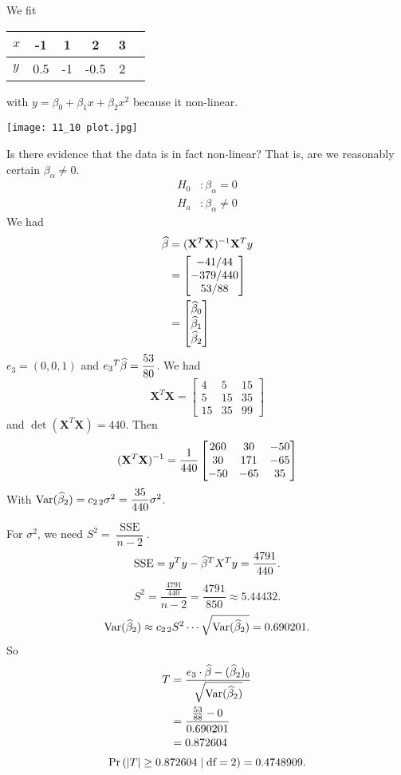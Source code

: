 \example*
We fit
\begin{center}
    \begin{tabular}{|l|c|c|c|c|c|}
         \hline
         $x$ & -1 & 1 & 2 & 3\\
         \hline
         $y$ & 0.5 & -1 & -0.5 & 2\\
         \hline
    \end{tabular}
\end{center}
with $y = \beta_0 + \beta_1 x + \beta_2 x^2$ because it  non-linear.
\begin{center}
    \texttt{[image: 11\_10 plot.jpg]}
\end{center}
Is there evidence that the data is in fact non-linear? That is, are we reasonably certain $\beta_{\alpha} \neq 0$.
\begin{align*}
    H_0 &: \beta_{\alpha} = 0\\
    H_a &: \beta_{\alpha} \neq 0
\end{align*}
We had
\begin{align*}
    \widehat{\beta} &= (\mathbf X^T \mathbf X )^{-1} \mathbf X^T y\\
    &= \begin{bmatrix}
        -41/44\\ -379/440 \\ 53/88
    \end{bmatrix}\\
    &= \vvec*{\betah_0}{\betah_1}{\betah_2}
\end{align*}
$e_3 = (0,0,1)$ and ${e_3}^T\widehat{\beta} = \dfrac{53}{80}$. We had
$$\mathbf X^T \mathbf X = \begin{bmatrix}
    4 & 5 & 15\\ 5 & 15 & 35 \\ 15 & 35 & 99
\end{bmatrix}$$
and $\det (\mathbf X^T \mathbf X) = 440$. Then
$$(\mathbf X^T \mathbf X)^{-1} = \over{440} \begin{bmatrix}
    260 & 30 & -50 \\
    30 & 171 & -65\\
    -50 & -65 & 35
\end{bmatrix}$$
With $\Var*{\betah_2} = c_{2\,2} \sigma^2 = \dfrac{35}{440}\sigma^2$. %

\nl For $\sigma^2$, we need $S^2 = \dfrac{\operatorname{SSE}}{n-2}$.
$$\operatorname{SSE} = y^Ty - \widehat{\beta}^T X^Ty = \frac{4791}{440}.$$
$$S^2 = \frac{\frac{4791}{440}}{n-2} = \frac{4791}{850} \approx 5.44432.$$
$$\Var*{\betah_2} \approx c_{2\,2} S^2 \cdots \sqrt{\Var*{\betah_2}} = 0.690201.$$
So
\begin{align*}
    T &= \frac{e_3 \cdot \betah - (\betah_2)_0}{\sqrt{\Var*{\betah_2}}}\\
    &= \frac{\frac{53}{88}-0}{0.690201}\\
    &= 0.872604
\end{align*}
$$\P{\abs{T} \geq 0.872604 \mid \df = 2} = 0.4748909.$$

